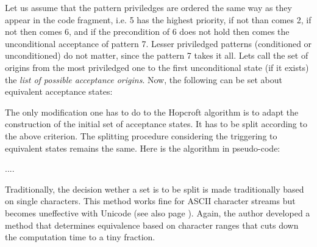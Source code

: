 Let us assume that the pattern priviledges are ordered the same way as they
appear in the code fragment, i.e. 5 has the highest priority, if not than comes
2, if not then comes 6, and if the precondition of 6 does not hold then comes
the unconditional acceptance of pattern 7. Lesser priviledged patterns
(conditioned or unconditioned) do not matter, since the pattern 7 takes it all.
Lets call the set of origins from the most priviledged one to the first
unconditional state (if it exists) the {\it list of possible
    acceptance origins}. Now, the following can be set about equivalent
    acceptance states:



The only modification one has to do to the Hopcroft algorithm is to adapt
the construction of the initial set of acceptance states. It has to be
split according to the above criterion. The splitting procedure considering the
triggering to equivalent states remains the same. Here is the algorithm 
in pseudo-code:

....

Traditionally, the decision wether a set is to be split is made traditionally \cite{}
based on single characters. This method works fine for ASCII character streams
but becomes uneffective with Unicode (see also page \pageref{}). Again, the author
developed a method that determines equivalence based on character ranges that cuts
down the computation time to a tiny fraction.


       
